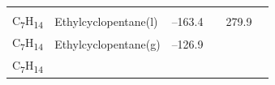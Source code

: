 \documentclass[
  9pt,
]{extbook}
\theoremstyle{definition}
\theoremstyle{definition}
\theoremstyle{definition}
\theoremstyle{remark}
\begin{document}
\begin{longtable}[]{@{}llllll@{}}
\begin{minipage}[t]{0.15\columnwidth}
\strut
\end{minipage} & \begin{minipage}[t]{0.14\columnwidth}\raggedright
\strut
\end{minipage} & \begin{minipage}[t]{0.14\columnwidth}\raggedright
\strut
\end{minipage}\tabularnewline
\begin{minipage}[t]{0.07\columnwidth}\raggedright
C\textsubscript{7}H\textsubscript{14}\strut
\end{minipage} & \begin{minipage}[t]{0.17\columnwidth}\raggedright
Ethylcyclopentane(l)\strut
\end{minipage} & \begin{minipage}[t]{0.15\columnwidth}\raggedright
--163.4\strut
\end{minipage} & \begin{minipage}[t]{0.15\columnwidth}\raggedright
\strut
\end{minipage} & \begin{minipage}[t]{0.14\columnwidth}\raggedright
279.9\strut
\end{minipage} & \begin{minipage}[t]{0.14\columnwidth}\raggedright
\strut
\end{minipage}\tabularnewline
\begin{minipage}[t]{0.07\columnwidth}\raggedright
C\textsubscript{7}H\textsubscript{14}\strut
\end{minipage} & \begin{minipage}[t]{0.17\columnwidth}\raggedright
Ethylcyclopentane(g)\strut
\end{minipage} & \begin{minipage}[t]{0.15\columnwidth}\raggedright
--126.9\strut
\end{minipage} & \begin{minipage}[t]{0.15\columnwidth}\raggedright
\strut
\end{minipage} & \begin{minipage}[t]{0.14\columnwidth}\raggedright
\strut
\end{minipage} & \begin{minipage}[t]{0.14\columnwidth}\raggedright
\strut
\end{minipage}\tabularnewline
\begin{minipage}[t]{0.07\columnwidth}\raggedright
C\textsubscript{7}H\textsubscript{14}\strut
\end{minipage} & \begin{minipage}[t]{0.17\columnwidth}\raggedright

\end{minipage}
\end{longtable}
\end{document}
